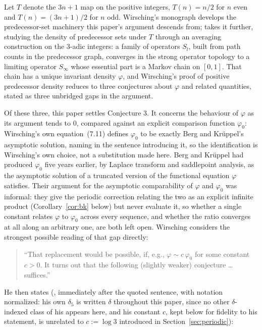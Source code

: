 \documentclass[11pt]{amsart}
\theoremstyle{plain}
\theoremstyle{definition}
\theoremstyle{remark}
\begin{document}
Let $T$ denote the $3n+1$ map on the positive integers, $T(n) = n/2$ for $n$ even and $T(n) =
(3n+1)/2$ for $n$ odd. Wirsching's monograph \cite{wirsching1998} develops the predecessor-set
machinery this paper's argument descends from; \cite{wirsching2003} takes it further, studying the
density of predecessor sets under $T$ through an averaging construction on the $3$-adic integers: a
family of operators $S_l$, built from path counts in the predecessor graph, converges in the strong
operator topology to a limiting operator $S_\infty$ whose essential part is a Markov chain on
$[0,1]$. That chain has a unique invariant density $\varphi$, and Wirsching's proof of positive
predecessor density reduces to three conjectures about $\varphi$ and related quantities, stated as
three unbridged gaps in the argument.

Of these three, this paper settles Conjecture 3. It concerns the behaviour of $\varphi$ as its argument tends
to $0$, compared against an explicit comparison function $\varphi_0$: Wirsching's own
equation~(7.11) defines $\varphi_0$ to be exactly Berg and Kr\"uppel's asymptotic solution, naming
\cite{bergkruppel1998} in the sentence introducing it, so the identification is Wirsching's own choice, not
a substitution made here. Berg and Kr\"uppel had produced $\varphi_0$ five years earlier, by
Laplace transform and saddlepoint analysis, as the asymptotic solution of a truncated version of
the functional equation $\varphi$ satisfies. Their argument for the asymptotic comparability of
$\varphi$ and $\varphi_0$ was informal: they give the periodic correction relating the two as an
explicit
infinite product (Corollary~\ref{cor:bk} below) but never evaluate it, so whether a single
constant relates $\varphi$ to $\varphi_0$ across every sequence, and whether the ratio converges at
all along an arbitrary one, are both left open. Wirsching considers the strongest possible reading
of that gap directly:

\begin{quote}
``That replacement would be possible, if, e.g., $\varphi \sim c\,\varphi_0$ for some constant
$c > 0$. It turns out that the following (slightly weaker) conjecture \dots suffices.''
\end{quote}

He then states (\cite{wirsching2003}, immediately after the quoted sentence, with notation
normalized: his own $\delta_5$ is written $\delta$ throughout this paper, since no other
$\delta$-indexed class of his appears here, and his constant $c$, kept below for fidelity to his
statement, is unrelated to $c:=\log3$ introduced in Section~\ref{sec:periodic}):
\end{document}
